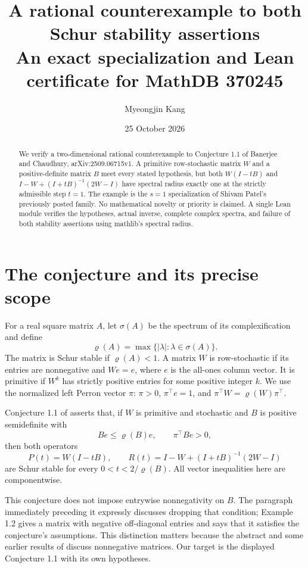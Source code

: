 \documentclass[11pt]{article}
\title{A rational counterexample to both Schur stability assertions\\
\large An exact specialization and Lean certificate for MathDB 370245}
\author{Myeongjin Kang}
\date{25 October 2026}
\newcommand{\rhoo}{\varrho}
\begin{document}
\maketitle
\begin{abstract}
We verify a two-dimensional rational counterexample to Conjecture 1.1 of
Banerjee and Chaudhury, arXiv:2509.06715v1. A primitive row-stochastic matrix
$W$ and a positive-definite matrix $B$ meet every stated hypothesis, but both
$W(I-tB)$ and $I-W+(I+tB)^{-1}(2W-I)$ have spectral radius exactly one at
the strictly admissible step $t=1$. The example is the $s=1$ specialization
of Shivam Patel's previously posted family. No mathematical novelty or
priority is claimed. A single Lean module verifies the hypotheses, actual
inverse, complete complex spectra, and failure of both stability assertions
using mathlib's spectral radius.
\end{abstract}

\section{The conjecture and its precise scope}
For a real square matrix $A$, let $\sigma(A)$ be the spectrum of its
complexification and define
\[
 \rhoo(A)=\max\{|\lambda|:\lambda\in\sigma(A)\}.
\]
The matrix is Schur stable if $\rhoo(A)<1$. A matrix $W$ is row-stochastic
if its entries are nonnegative and $We=e$, where $e$ is the all-ones column
vector. It is primitive if $W^k$ has strictly positive entries for some
positive integer $k$. We use the normalized left Perron vector $\pi$:
$\pi>0$, $\pi^\top e=1$, and
$\pi^\top W=\rhoo(W)\pi^\top$.

Conjecture 1.1 of \cite{BC} asserts that, if $W$ is primitive and stochastic
and $B$ is positive semidefinite with
\begin{equation}\label{eq:hyp}
 Be\leq\rhoo(B)e,\qquad \pi^\top Be>0,
\end{equation}
then both operators
\begin{equation}\label{eq:operators}
 P(t)=W(I-tB),\qquad R(t)=I-W+(I+tB)^{-1}(2W-I)
\end{equation}
are Schur stable for every $0<t<2/\rhoo(B)$.
All vector inequalities here are componentwise.

This conjecture does not impose entrywise nonnegativity on $B$.
The paragraph immediately preceding it expressly discusses dropping that
condition; Example 1.2 gives a matrix with negative off-diagonal entries
and says that it satisfies the conjecture's assumptions. This distinction
matters because the abstract and some earlier results of \cite{BC} discuss
nonnegative matrices. Our target is the displayed Conjecture 1.1 with its
own hypotheses.
\end{document}
